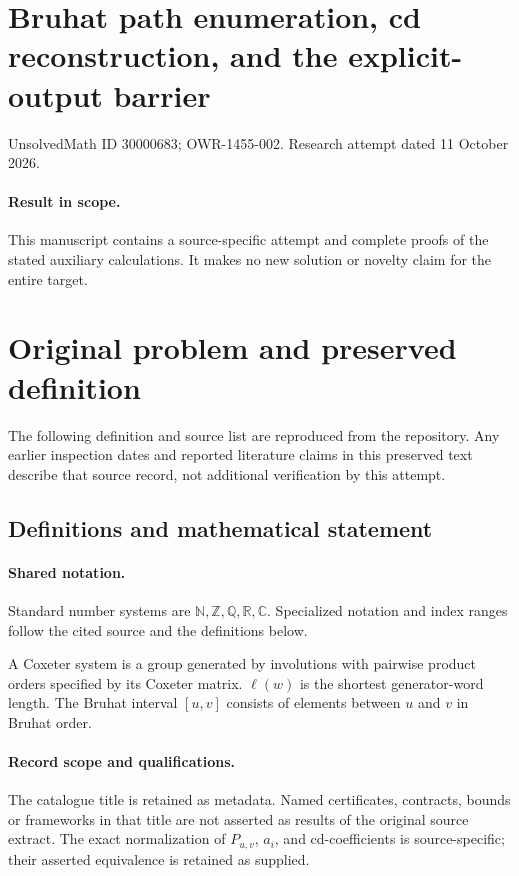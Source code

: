 \documentclass[11pt]{article}
\begin{document}
\section*{Bruhat path enumeration, cd reconstruction, and the explicit-output barrier}
\noindent UnsolvedMath ID 30000683; OWR-1455-002. Research attempt dated 11 October 2026.
\paragraph{Result in scope.}This manuscript contains a source-specific attempt and complete proofs of the stated auxiliary calculations. It makes no new solution or novelty claim for the entire target.
\section{Original problem and preserved definition}
The following definition and source list are reproduced from the repository. Any earlier inspection dates and reported literature claims in this preserved text describe that source record, not additional verification by this attempt.
\subsection{Definitions and mathematical statement}

\paragraph{Shared notation.}Standard number systems are $\mathbb N,\mathbb Z,\mathbb Q,\mathbb R,\mathbb C$. Specialized notation and index ranges follow the cited source and the definitions below.


A Coxeter system is a group generated by involutions with pairwise product orders specified by its Coxeter matrix. $\ell(w)$ is the shortest generator-word length. The Bruhat interval $[u,v]$ consists of elements between $u$ and $v$ in Bruhat order.
\paragraph{Record scope and qualifications.}
The catalogue title is retained as metadata. Named certificates, contracts, bounds or frameworks in that title are not asserted as results of the original source extract.
The exact normalization of $P_{u,v}$, $a_i$, and cd-coefficients is source-specific; their asserted equivalence is retained as supplied.
\end{document}
